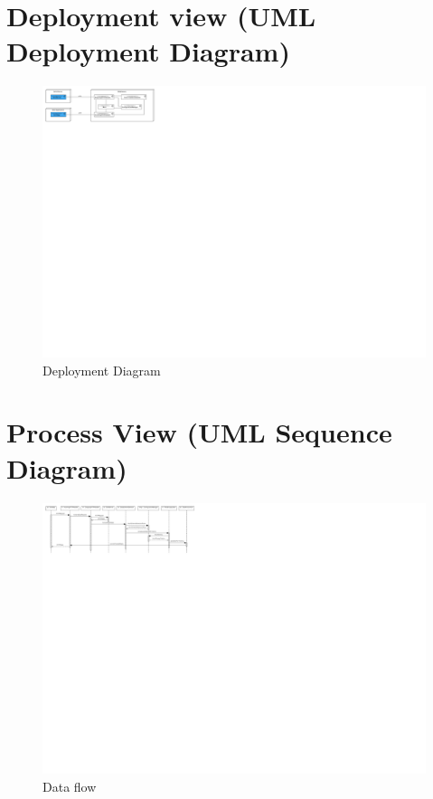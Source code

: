 \chapter{Deployment view (UML Deployment Diagram)}
\minilof{}





\begin{figure}[!htp]
  \centering
  \includegraphics[width=\maxwidth{\textwidth}]{appendices/architecture/images/DeploymentDiagram-Deployment-Diagram.pdf}
  \caption[Deployment Diagram]{Deployment Diagram \label{diag:Deployment:DeploymentDiagram}}
\end{figure}



\chapter{Process View (UML Sequence Diagram)}
\minilof{}



\begin{figure}[!htp]
  \centering
  \includegraphics[width=\maxwidth{\textwidth}]{appendices/architecture/images/InteractionDiagram-Data-flow.pdf}
  \caption[Data flow]{Data flow \label{diag:Interaction:Dataflow}}
\end{figure}
